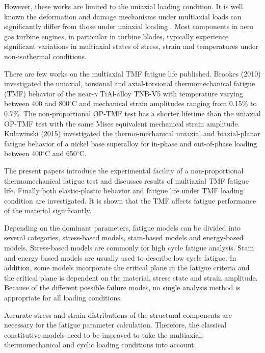 However, these works are limited to the uniaxial loading condition.
It is well known the deformation and damage mechanisms under multiaxial loads can significantly differ from those under uniaxial loading \cite{fang2015cyclic}\cite{kang2004uniaxial}\cite{chen2004modified}.
Most components in aero gas turbine engines, in particular in turbine blades, typically experience significant variations in multiaxial states of stress, strain and temperatures under non-isothermal conditions.

There are few works on the multiaxial TMF fatigue life published.
Brookes (2010) \cite{brookes2010axial} investigated the uniaxial, torsional and axial-torsional thermomechanical fatigue (TMF) behavior of the near-$\gamma$ TiAl-alloy TNB-V5 with temperature varying between 400 and 800$^{\circ}$C and mechanical strain amplitudes ranging from 0.15\% to 0.7\%. The non-proportional OP-TMF test has a shorter lifetime than the uniaxial OP-TMF test with the same Mises equivalent mechanical strain amplitude.
Kulawinski (2015) \cite{Kulawinski201521} investigated the thermo-mechanical uniaxial and biaxial-planar fatigue behavior of a nickel base superalloy for in-phase and out-of-phase loading between 400$^{\circ}$C and 650$^{\circ}$C.

The present papers introduce the experimental facility of a non-proportional thermomechanical fatigue test and discusses results of multiaxial TMF fatigue life.
Finally both elastic-plastic behavior and fatigue life under TMF loading condition are investigated.
It is shown that the TMF affects fatigue performance of the material significantly.

Depending on the dominant parameters, fatigue models can be divided into several categories, stress-based models, stain-based models and energy-based models.
Stress-based models are commonly for high cycle fatigue analysis.
Stain and energy based models are usually used to describe low cycle fatigue.
In addition, some models incorporate the critical plane in the fatigue criteria and the critical plane is dependent on the material, stress state and strain amplitude.
Because of the different possible failure modes, no single analysis method is appropriate for all loading conditions.

Accurate stress and strain distributions of the structural components are necessary for the fatigue parameter calculation.
Therefore, the classical constitutive models need to be improved to take the multiaxial, thermomechanical and cyclic loading conditions into account.

